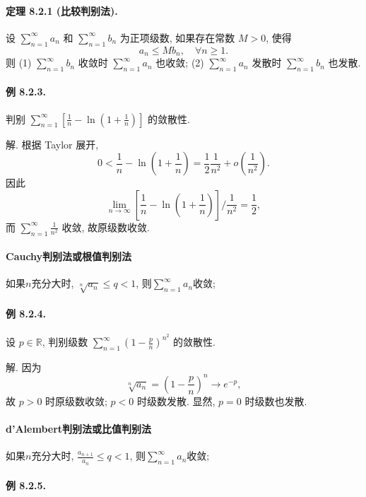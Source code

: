 \paragraph{定理 8.2.1 (比较判别法). }

设 $\sum_{n=1}^{\infty}a_{n}$ 和 $\sum_{n=1}^{\infty}b_{n}$ 为正项级数,
如果存在常数 $M>0$, 使得 
\[
a_{n}\leqslant Mb_{n},\quad\forall n\geqslant1.
\]
则 (1) $\sum_{n=1}^{\infty}b_{n}$ 收敛时 $\sum_{n=1}^{\infty}a_{n}$
也收敛; (2) $\sum_{n=1}^{\infty}a_{n}$ 发散时 $\sum_{n=1}^{\infty}b_{n}$
也发散.

\paragraph{例 8.2.3. }

判别 $\sum_{n=1}^{\infty}\left[\frac{1}{n}-\ln\left(1+\frac{1}{n}\right)\right]$
的敛散性. 

解. 根据 Taylor 展开, 
\[
0<\frac{1}{n}-\ln\left(1+\frac{1}{n}\right)=\frac{1}{2}\frac{1}{n^{2}}+o\left(\frac{1}{n^{2}}\right).
\]
因此 
\[
\lim_{n\rightarrow\infty}\left[\frac{1}{n}-\ln\left(1+\frac{1}{n}\right)\right]/\frac{1}{n^{2}}=\frac{1}{2},
\]
而 $\sum_{n=1}^{\infty}\frac{1}{n^{2}}$ 收敛, 故原级数收敛.

\paragraph{Cauchy判别法或根值判别法}

如果$n$充分大时, $\sqrt[n]{a_{n}}\le q<1$, 则$\sum_{n=1}^{\infty}a_{n}$收敛;

\paragraph{例 8.2.4. }

设 $p\in\mathbb{R}$, 判别级数 $\sum_{n=1}^{\infty}\left(1-\frac{p}{n}\right)^{n^{2}}$
的敛散性. 

解. 因为 
\[
\sqrt[n]{a_{n}}=\left(1-\frac{p}{n}\right)^{n}\rightarrow e^{-p},
\]
故 $p>0$ 时原级数收敛; $p<0$ 时级数发散. 显然, $p=0$ 时级数也发散.

\paragraph{d'Alembert判别法或比值判别法}

如果$n$充分大时, $\frac{a_{n+1}}{a_{n}}\le q<1$, 则$\sum_{n=1}^{\infty}a_{n}$收敛;

\paragraph{例 8.2.5. }

